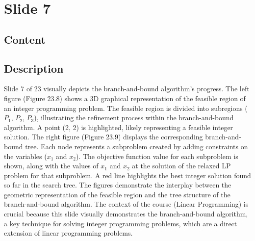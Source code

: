 \documentclass{article}%
\begin{document}
%
\newpage%
\section{Slide 7}%
\label{sec:Slide7}%
\subsection{Content}%

%
\subsection{Description}%
Slide 7 of 23 visually depicts the branch-and-bound algorithm's progress. The left figure (Figure 23.8) shows a 3D graphical representation of the feasible region of an integer programming problem. The feasible region is divided into subregions ($P_1$, $P_2$, $P_3$), illustrating the refinement process within the branch-and-bound algorithm.  A point (2, 2) is highlighted, likely representing a feasible integer solution. The right figure (Figure 23.9) displays the corresponding branch-and-bound tree. Each node represents a subproblem created by adding constraints on the variables ($x_1$ and $x_2$).  The objective function value for each subproblem is shown, along with the values of $x_1$ and $x_2$ at the solution of the relaxed LP problem for that subproblem. A red line highlights the best integer solution found so far in the search tree. The figures demonstrate the interplay between the geometric representation of the feasible region and the tree structure of the branch-and-bound algorithm. The context of the course (Linear Programming) is crucial because this slide visually demonstrates the branch-and-bound algorithm, a key technique for solving integer programming problems, which are a direct extension of linear programming problems.%
\end{document}
